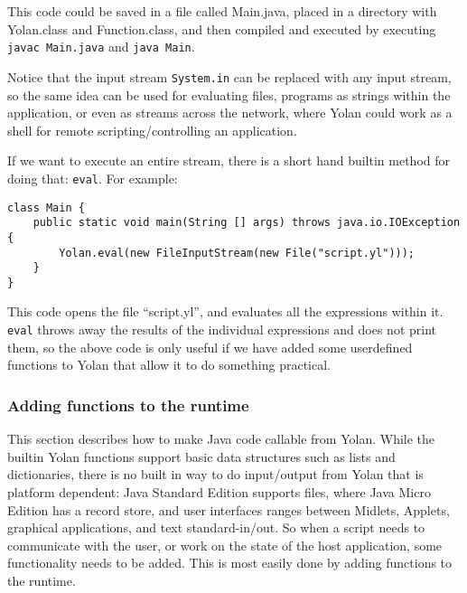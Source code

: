 \documentclass[11pt]{report}
\begin{document}
This code could be saved in a file called Main.java, placed in a directory with Yolan.class and Function.class, and then compiled and executed by executing \verb|javac Main.java| and \verb|java Main|.

Notice that the input stream \verb|System.in| can be replaced with any input stream, so the same idea can be used for evaluating files, programs as strings within the application, or even as streams across the network, where Yolan could work as a shell for remote scripting/controlling an application.

If we want to execute an entire stream, there is a short hand builtin method for doing that: \verb|eval|. For example:
\begin{lstlisting}
class Main {
    public static void main(String [] args) throws java.io.IOException {
        Yolan.eval(new FileInputStream(new File("script.yl")));
    }
}
\end{lstlisting}
This code opens the file ``script.yl'', and evaluates all the expressions within it. 
\verb|eval| throws away the results of the individual expressions and does not print them,
so the above code is only useful if we have added some userdefined functions to Yolan that allow it to do something practical.

\subsubsection{Adding functions to the runtime}
This section describes how to make Java code callable from Yolan.
While the builtin Yolan functions support basic data structures such as lists and dictionaries,  there is no built in way to do input/output from Yolan that is platform dependent: Java Standard Edition supports files, where Java Micro Edition has a record store, and user interfaces ranges between Midlets, Applets, graphical applications, and text standard-in/out.
So when a script needs to communicate with the user, or work on the state of the host application, 
some functionality needs to be added. This is most easily done by adding functions to the runtime.
\end{document}
